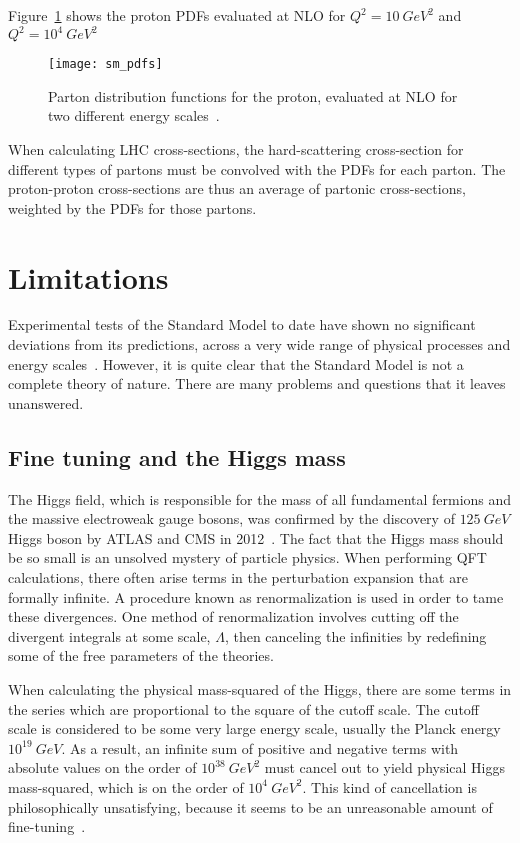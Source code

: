 Figure~\ref{fig:sm_pdfs} shows the proton PDFs evaluated at NLO for $Q^2 = 10~GeV^2$ and $Q^2 = 10^{4}~GeV^2$
\begin{figure}[!ht]
    \centering
\texttt{[image: sm\_pdfs]}
\caption{Parton distribution functions for the proton, evaluated at NLO for two different energy scales~\cite{sm-pdf-2009}.}
\label{fig:sm_pdfs}
\end{figure}

When calculating LHC cross-sections, the hard-scattering cross-section for different types of partons
must be convolved with the PDFs for each parton.
The proton-proton cross-sections are thus an average of partonic cross-sections, weighted by the PDFs for those partons.

\section{Limitations}\label{sec:sm_limits}

Experimental tests of the Standard Model to date have shown no significant deviations from its predictions,
across a very wide range of physical processes and energy scales~\cite{sm-summary-plots}.
However, it is quite clear that the Standard Model is not a complete theory of nature.
There are many problems and questions that it leaves unanswered.

\subsection{Fine tuning and the Higgs mass}\label{subsec:sm_hierarchy}

The Higgs field, which is responsible for the mass of all fundamental fermions and the massive electroweak gauge bosons, was confirmed by the discovery of $125~GeV$ Higgs boson by ATLAS and CMS in 2012~\cite{sm-higgs-discovery-atlas,sm-higgs-discovery-cms}.
The fact that the Higgs mass should be so small is an unsolved mystery of particle physics.
When performing QFT calculations, there often arise terms in the perturbation expansion that are formally infinite.
A procedure known as renormalization is used in order to tame these divergences.
One method of renormalization involves cutting off the divergent integrals at some scale, $\Lambda$, then canceling the infinities by redefining some of the free parameters of the theories.

When calculating the physical mass-squared of the Higgs, there are some terms in the series which are proportional to the square of the cutoff scale.
The cutoff scale is considered to be some very large energy scale, usually the Planck energy $10^{19}~GeV$.
As a result, an infinite sum of positive and negative terms with absolute values on the order of $10^{38}~GeV^2$ must cancel out to yield physical Higgs mass-squared, which is on the order of $10^4~GeV^2$.
This kind of cancellation is philosophically unsatisfying, because it seems to be an unreasonable amount of fine-tuning~\cite{sm-higgs-naturalness}.

